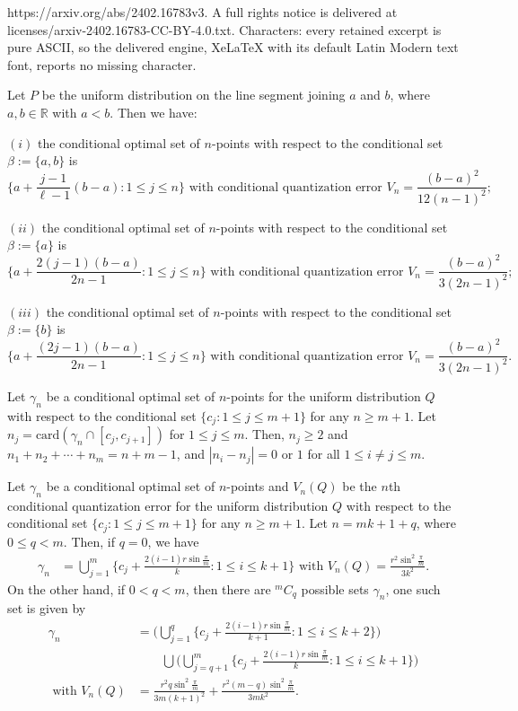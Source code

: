 \documentclass[10pt,a4paper]{amsart}
\newcommand{\D}[1]{\mathbb{#1}}%
\newcommand{\UU}{\bigcup}%
\newcommand{\gb}{\beta}
\newcommand{\ii}{\cap}%
\newcommand{\set}[1]{\{#1\}}%
\newcommand{\te}{\text}%
\renewcommand{\gg}{\gamma}%
\begin{document}
https://arxiv.org/abs/2402.16783v3. A full rights notice is delivered at licenses/arxiv-2402.16783-CC-BY-4.0.txt. Characters: every retained excerpt is pure ASCII, so the delivered engine, XeLaTeX with its default Latin Modern text font, reports no missing character.
\begin{theorem}\label{theoM0}
Let $P$ be the uniform distribution on the line segment joining $a$ and $b$, where $a, b\in \D R$ with $a<b$. Then we have:  

$(i)$ the conditional optimal set of $n$-points with respect to the conditional set $\gb:=\set{a, b}$ is  
\[\Big\{a+\frac{j-1}{\ell-1}(b-a) : 1\leq j\leq n\Big\} \te{ with conditional quantization error } V_n=\frac {(b-a)^2}{12(n-1)^2};\]


$(ii)$ the conditional optimal set of $n$-points with respect to the conditional set $\gb:=\set{a}$ is  
\[\Big\{a+\frac{2(j-1)(b-a)}{2n-1}   : 1\leq j\leq n\Big\} \te{ with conditional quantization error } V_n=\frac {(b-a)^2}{3(2n-1)^2};\]

$(iii)$ the conditional optimal set of $n$-points with respect to the conditional set $\gb:=\set{b}$ is  
\[\Big\{a+\frac{(2j-1)(b-a)}{2n-1}   : 1\leq j\leq n\Big\} \te{ with conditional quantization error } V_n=\frac {(b-a)^2}{3(2n-1)^2}.\]
\end{theorem}

\begin{lemma} \label{lemma34} 
Let $\gg_n$ be a conditional optimal set of $n$-points for the uniform distribution $Q$ with respect to the conditional set $\set{c_j : 1\leq j\leq m+1}$ for any $n\geq m+1$. Let $n_j=\te{card}(\gg_n\ii [c_j, c_{j+1}])$ for $1\leq j\leq m$. Then, $n_j\geq 2$ and $ n_1+n_2+\cdots +n_m=n+m-1$, and $|n_i-n_{j}|=0 \te{ or } 1$  for all $1\leq i\neq  j\leq m$. 
\end{lemma} 

\begin{prop} \label{prop45} 
Let $\gg_n$ be a conditional optimal set of $n$-points and $V_n(Q)$ be the $n$th conditional quantization error for the uniform distribution $Q$ with respect to the conditional set $\set{c_j : 1\leq j\leq m+1}$ for any $n\geq m+1$. Let $n=m k +1+q$, where $0\leq q< m$. Then, if $q=0$,  
we have 
\begin{align} \label{Megha101} 
\gg_n& = \UU_{j=1}^{m}\{c_j+\frac{2(i-1)r\sin \frac{\pi}m}{k}  : 1\leq i\leq k+1\} \te{ with } V_n(Q)=\frac {r^2 \sin^2\frac{\pi} m}{3k^2}.
\end{align} 
On the other hand, if $0<q<m$, then there are $^mC_q$ possible sets $\gg_n$, one such set is given by 
\begin{equation}\label{Megha102} 
\begin{aligned} 
\gg_n  &= \Big(\UU_{j=1}^{q}\{c_j+\frac{2(i-1)r\sin \frac{\pi}m}{k+1} : 1\leq i\leq k+2\}\Big)\\
&\qquad \UU \Big(\UU_{j=q+1}^{m}\{c_j+\frac{2(i-1)r\sin \frac{\pi}m}{k}  : 1\leq i\leq k+1\}\Big)\\
\te{ with }    V_n(Q)&=\frac {r^2q\sin^2\frac{\pi} m}{3m(k+1)^2}+ \frac {r^2(m-q)\sin^2\frac{\pi} m}{3mk^2}.
 \end{aligned}
\end{equation}  
 \end{prop} 
\end{document}
